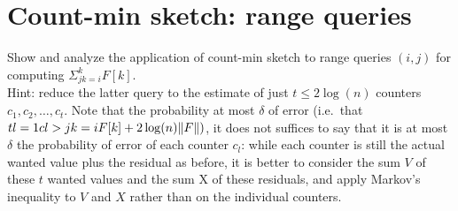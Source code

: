 \section{Count-min sketch: range queries}

Show and analyze the application of count-min sketch to range queries $(i, j)$ for
computing $\Sigma_{jk=i}^{k} F[k]$.\\
Hint: reduce the latter query to the estimate of just $t \leq 2 \log(n)$ counters
$c_1, c_2, \dots, c_t$.
Note that the probability at most $\delta$ of error (i.e.\ that $tl = 1 c l > jk = i F[k] + 2 \log(n) \lVert F\rVert)$,
it does not suffices to say that it is at most $\delta$ the probability of error
of each counter $c_l$: while each counter is still the actual wanted value plus
the residual as before, it is better to consider the sum $V$ of these $t$ wanted
values and the sum X of these residuals, and apply Markov’s inequality to $V$ and
$X$ rather than on the individual counters.

